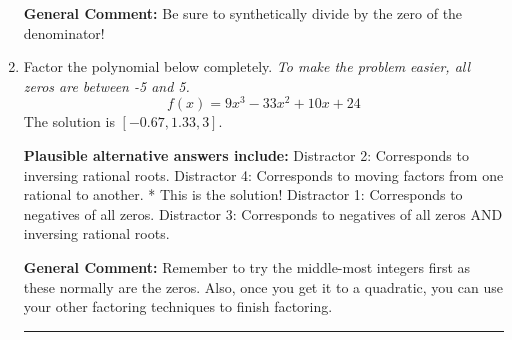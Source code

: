 \documentclass{extbook}[14pt]
\newcommand{\litem}[1]{\item #1

\rule{\textwidth}{0.4pt}}
\begin{document}
\begin{enumerate}
{\textbf{General Comment:} Be sure to synthetically divide by the zero of the denominator!
}
\litem{
Factor the polynomial below completely. \textit{To make the problem easier, all zeros are between -5 and 5.}
\[ f(x) = 9x^{3} -33 x^{2} +10 x + 24 \]The solution is \( [-0.67, 1.33, 3] \).\begin{enumerate}[label=\Alph*.]
\textbf{Plausible alternative answers include:} Distractor 2: Corresponds to inversing rational roots.
 Distractor 4: Corresponds to moving factors from one rational to another.
* This is the solution!
 Distractor 1: Corresponds to negatives of all zeros.
 Distractor 3: Corresponds to negatives of all zeros AND inversing rational roots.
\end{enumerate}

\textbf{General Comment:} Remember to try the middle-most integers first as these normally are the zeros. Also, once you get it to a quadratic, you can use your other factoring techniques to finish factoring.
}
\end{enumerate}
\end{document}
